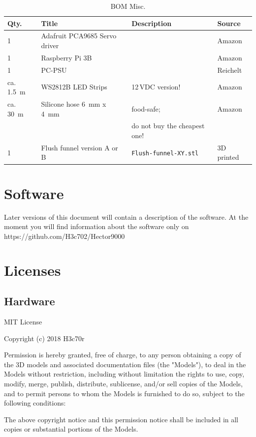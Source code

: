 \documentclass[a4paper]{scrartcl}
\begin{document}
\begin{table}
\caption{BOM Misc.}
\begin{tabular}{|l|l|l|l|}
\hline
Qty. & Title & Description & Source\\
\hline\hline
1 & Adafruit PCA9685 Servo driver & & Amazon \\
\hline 
1 & Raspberry Pi 3B & & Amazon\\
\hline  
1 & PC-PSU & & Reichelt\\
\hline
ca. \SI{1.5}{\metre} & WS2812B LED Strips & 12\,VDC version! & Amazon\\
\hline
ca. \SI{30}{\metre} & Silicone hose \SI{6}{\milli\metre} x \SI{4}{\milli\metre} & food-safe;                   & Amazon\\
                    &                                                           & do not buy the cheapest one! & \\
\hline 
1 & Flush funnel version A or B & \texttt{Flush-funnel-XY.stl} & 3D printed\\
\hline 
\end{tabular}
\end{table}

\FloatBarrier
\section{Software}
Later versions of this document will contain a description of the software. At the moment you will find information about the software only on https://github.com/H3c702/Hector9000


\section{Licenses}
\subsection{Hardware}
MIT License

\noindent
Copyright (c) 2018 H3c70r

\noindent
Permission is hereby granted, free of charge, to any person obtaining a copy
of the 3D models and associated documentation files (the "{}Models"{}), to deal
in the Models without restriction, including without limitation the rights
to use, copy, modify, merge, publish, distribute, sublicense, and/or sell
copies of the Models, and to permit persons to whom the Models is
furnished to do so, subject to the following conditions:

\noindent
The above copyright notice and this permission notice shall be included in all
copies or substantial portions of the Models.
\end{document}

